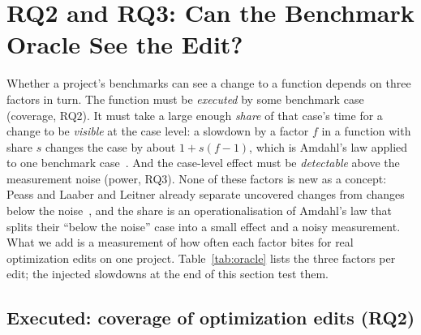 \section{RQ2 and RQ3: Can the Benchmark Oracle See the Edit?}
\label{sec:oracle}

Whether a project's benchmarks can see a change to a function depends on three factors in turn.
The function must be \emph{executed} by some benchmark case (coverage, RQ2).
It must take a large enough \emph{share} of that case's time for a change to be \emph{visible} at the case level: a slowdown by a factor $f$ in a function with share $s$ changes the case by about $1+s(f-1)$, which is Amdahl's law applied to one benchmark case~\cite{amdahl1967validity}.
And the case-level effect must be \emph{detectable} above the measurement noise (power, RQ3).
None of these factors is new as a concept: Peass and Laaber and Leitner already separate uncovered changes from changes below the noise~\cite{reichelt2023peass,laaber2018evaluation}, and the share is an operationalisation of Amdahl's law that splits their ``below the noise'' case into a small effect and a noisy measurement.
What we add is a measurement of how often each factor bites for real optimization edits on one project.
Table~\ref{tab:oracle} lists the three factors per edit; the injected slowdowns at the end of this section test them.

\begin{table}[t]
\caption{The benchmark oracle per agent-labelled optimization edit on networkx: number of benchmark cases whose $S_0$ profile executes a changed function; the largest share of a reaching case's time spent in the changed functions (cProfile at the edit's parent, approximate); and the expected case-level ratio $1+s(f-1)$ if the changed code were \PowFactorMid\x{} or \PowFactorHigh\x{} slower. Bold: above asv's factor of \AsvFactor{} at three decimals, so a flag is possible before noise is considered. ``--'': no case executes the edit.}
\label{tab:oracle}
\centering\footnotesize\setlength{\tabcolsep}{4pt}

\end{table}

\subsection{Executed: coverage of optimization edits (RQ2)}
\label{sec:rq2}

